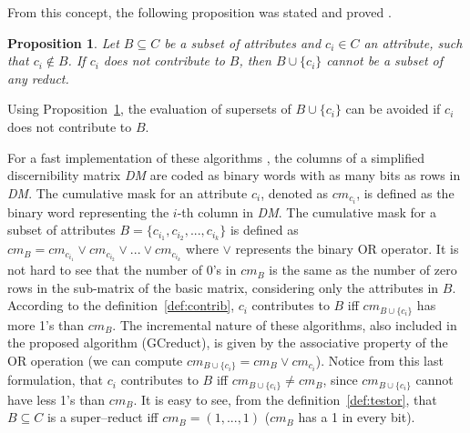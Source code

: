 \documentclass[number,preprint,review,12pt]{elsarticle}
\newtheorem{proposition}{Proposition}
\newtheorem{corollary}{Corollary}
\begin{document}
	From this concept, the following proposition was stated and proved \cite{Sanchez07}.
			
	\begin{proposition}\label{prop:contrib} 
		Let $B \subseteq C$ be a subset of attributes and $c_i \in C$ an attribute, such that $c_i \notin B$. If $c_i$ does not contribute to $B$, then $B\cup\{c_i\}$ cannot be a subset of any reduct.
	\end{proposition}
	
	Using Proposition~\ref{prop:contrib}, the evaluation of supersets of $B\cup\{c_i\}$ can be avoided if $c_i$ does not contribute to $B$.
	
	
	For a fast implementation of these algorithms \citep{Sanchez10,Lias13}, the columns of a simplified discernibility matrix \textit{DM} are coded as binary words with as many bits as rows in \textit{DM}. The cumulative mask for an attribute $c_i$, denoted as $cm_{c_i}$, is defined as the binary word representing the $i$-th column in \textit{DM}. The cumulative mask for a subset of attributes $B=\lbrace c_{i_1},c_{i_2},...,c_{i_k} \rbrace$ is defined	as $cm_B = cm_{c_{i_1}} \vee cm_{c_{i_2}} \vee ... \vee cm_{c_{i_k}}$ where $\vee$ represents the binary OR operator. It is not hard to see that the number of 0's in $cm_B$ is the same as the number of zero rows in the sub-matrix of the basic matrix, considering only the attributes in $B$. According to the definition~\ref{def:contrib}, $c_i$ contributes to $B$ iff $cm_{B\cup \lbrace c_i\rbrace}$ has more 1's than $cm_B$. The incremental nature of these algorithms, also included in  the proposed algorithm (GCreduct), is given by the associative property of the OR operation (we can compute $cm_{B\cup \lbrace c_i\rbrace}=cm_B\vee cm_{c_i}$). Notice from this last formulation, that $c_i$ contributes to $B$ iff $cm_{B\cup \lbrace c_i\rbrace}\neq cm_B$, since $cm_{B\cup \lbrace c_i\rbrace}$ cannot have less 1's than $cm_B$. It is easy to see, from the definition~\ref{def:testor}, that $B \subseteq C$ is a super--reduct iff $cm_B=(1,...,1)$ ($cm_B$ has a 1 in every bit).
	
\end{document}
